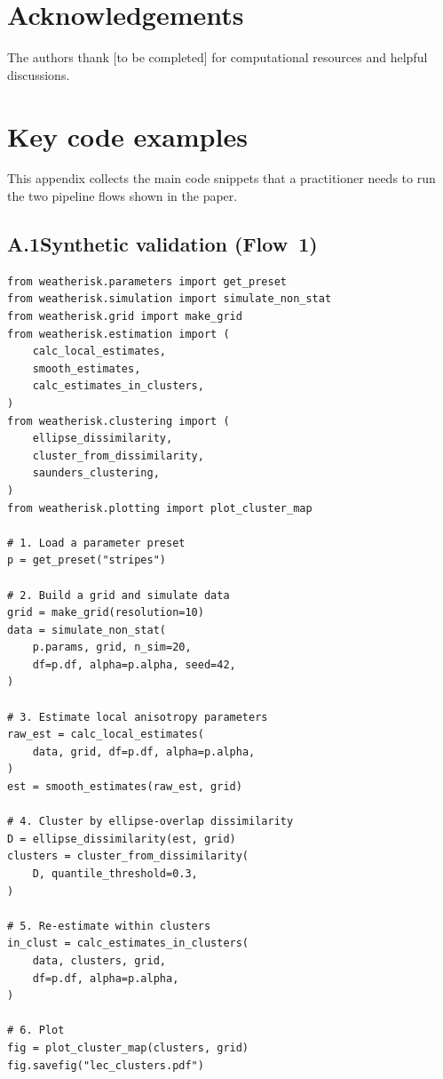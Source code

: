 \documentclass[preprint,12pt,a4paper]{elsarticle}
\begin{document}
\section*{Acknowledgements}

The authors thank [to be completed] for computational resources and
helpful discussions.

\appendix

\section{Key code examples}
\label{app:code}

This appendix collects the main code snippets that a practitioner
needs to run the two pipeline flows shown in the paper.

\subsection{A.1\quad Synthetic validation (Flow~1)}

\begin{lstlisting}[caption={Complete synthetic validation
  workflow.}, label=lst:app-validate]
from weatherisk.parameters import get_preset
from weatherisk.simulation import simulate_non_stat
from weatherisk.grid import make_grid
from weatherisk.estimation import (
    calc_local_estimates,
    smooth_estimates,
    calc_estimates_in_clusters,
)
from weatherisk.clustering import (
    ellipse_dissimilarity,
    cluster_from_dissimilarity,
    saunders_clustering,
)
from weatherisk.plotting import plot_cluster_map

# 1. Load a parameter preset
p = get_preset("stripes")

# 2. Build a grid and simulate data
grid = make_grid(resolution=10)
data = simulate_non_stat(
    p.params, grid, n_sim=20,
    df=p.df, alpha=p.alpha, seed=42,
)

# 3. Estimate local anisotropy parameters
raw_est = calc_local_estimates(
    data, grid, df=p.df, alpha=p.alpha,
)
est = smooth_estimates(raw_est, grid)

# 4. Cluster by ellipse-overlap dissimilarity
D = ellipse_dissimilarity(est, grid)
clusters = cluster_from_dissimilarity(
    D, quantile_threshold=0.3,
)

# 5. Re-estimate within clusters
in_clust = calc_estimates_in_clusters(
    data, clusters, grid,
    df=p.df, alpha=p.alpha,
)

# 6. Plot
fig = plot_cluster_map(clusters, grid)
fig.savefig("lec_clusters.pdf")
\end{lstlisting}
\end{document}
